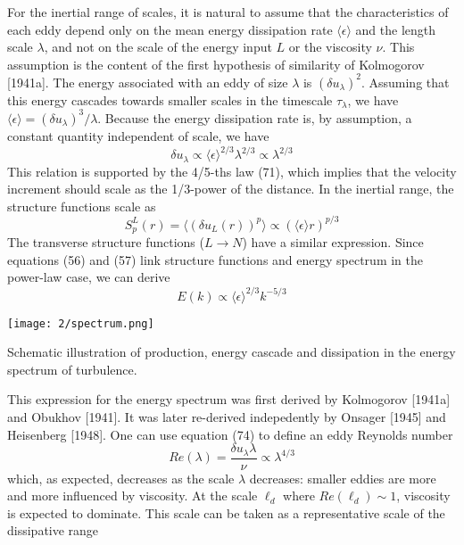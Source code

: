 For the inertial range of scales, it is natural to assume that the characteristics of each eddy depend only on the mean energy dissipation rate $\langle\epsilon\rangle$ and the length scale $\lambda$, and not on the scale of the energy input $L$ or the viscosity $\nu$. This assumption is the content of the first hypothesis of similarity of Kolmogorov [1941a]. The energy associated with an eddy of size $\lambda$ is $(\delta u_\lambda)^2$. Assuming that this energy cascades towards smaller scales in the timescale $\tau_\lambda$, we have $\langle\epsilon\rangle=(\delta u_\lambda)^3/\lambda$. Because the energy dissipation rate is, by assumption, a constant quantity independent of scale, we have
\begin{equation}
    \delta u_\lambda\propto\langle\epsilon\rangle^{2/3}\lambda^{2/3}\propto\lambda^{2/3}
\end{equation}
This relation is supported by the 4/5-ths law (71), which implies that the velocity increment should scale as the 1/3-power of the distance. In the inertial range, the structure functions scale as
\begin{equation}
    S_p^L(r)=\langle(\delta u_L(r))^p\rangle\propto(\langle\epsilon\rangle r)^{p/3}
\end{equation}
The transverse structure functions ($L\rightarrow N$) have a similar expression. Since equations (56) and (57) link structure functions and energy spectrum in the power-law case, we can derive 
\begin{equation}
    E(k)\propto\langle\epsilon\rangle^{2/3}k^{-5/3}
\end{equation}
\begin{marginfigure}
\texttt{[image: 2/spectrum.png]}
\caption{Schematic illustration of production, energy cascade and dissipation in the energy spectrum of turbulence.}
\end{marginfigure}
This expression for the energy spectrum was first derived by Kolmogorov [1941a] and Obukhov [1941]. It was later re-derived indepedently by Onsager [1945] and Heisenberg [1948]. One can use equation (74) to define an eddy Reynolds number 
\begin{equation}
    Re(\lambda)=\frac{\delta u_\lambda\lambda}{\nu}\propto\lambda^{4/3}
\end{equation}
which, as expected, decreases as the scale $\lambda$ decreases: smaller eddies are more and more influenced by viscosity. At the scale $\ell_d$ where $Re(\ell_d ) \sim 1$, viscosity is expected to dominate. This scale can be taken as a representative scale of the dissipative range
